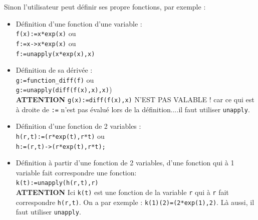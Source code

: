 \documentclass{article}
\begin{document}
\begin{giacjshere}
Sinon l'utilisateur peut d\'efinir ses propre fonctions, par exemple :
\begin{itemize}
\item D\'efinition d'une fonction d'une variable :\\
{\tt f(x):=x*exp(x)} ou\\
{\tt f:=x->x*exp(x)} ou\\
{\tt f:=unapply(x*exp(x),x)}
\item D\'efinition de sa d\'eriv\'ee :\\
{\tt g:=function\_diff(f)} ou \\
{\tt g:=unapply(diff(f(x),x),x)})\\
{\bf ATTENTION} {\tt g(x):=diff(f(x),x)} N'EST PAS VALABLE ! car ce qui est 
\`a droite de {\tt :=} n'est pas \'evalu\'e lors de la d\'efinition....il
faut utiliser {\tt unapply}.
\item D\'efinition d'une fonction de 2 variables :\\
{\tt h(r,t):=(r*exp(t),r*t)} ou\\
{\tt h:=(r,t)->(r*exp(t),r*t);}
\item D\'efinition \`a partir d'une fonction de 2 variables, d'une fonction qui
\`a 1 variable fait correspondre une fonction:\\
{\tt k(t):=unapply(h(r,t),r)}\\
{\bf ATTENTION} Ici {\tt k(t)} est une fonction de la variable {\tt r}
qui \`a {\tt r} fait 
correspondre {\tt h(r,t)}. On a par exemple : {\tt k(1)(2)=(2*exp(1),2)}. L\`a aussi, il faut 
utiliser {\tt unapply}.
\end{itemize}


\end{giacjshere}
\end{document}
